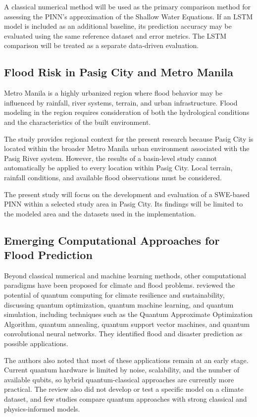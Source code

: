 A classical numerical method will be used as the primary comparison method for assessing the PINN's approximation of the Shallow Water Equations. If an LSTM model is included as an additional baseline, its prediction accuracy may be evaluated using the same reference dataset and error metrics. The LSTM comparison will be treated as a separate data-driven evaluation.

\subsection{Flood Risk in Pasig City and Metro Manila}

Metro Manila is a highly urbanized region where flood behavior may be influenced by rainfall, river systems, terrain, and urban infrastructure. Flood modeling in the region requires consideration of both the hydrological conditions and the characteristics of the built environment.

The study provides regional context for the present research because Pasig City is located within the broader Metro Manila urban environment associated with the Pasig River system. However, the results of a basin-level study cannot automatically be applied to every location within Pasig City. Local terrain, rainfall conditions, and available flood observations must be considered.

The present study will focus on the development and evaluation of a SWE-based PINN within a selected study area in Pasig City. Its findings will be limited to the modeled area and the datasets used in the implementation.

\subsection{Emerging Computational Approaches for Flood Prediction}

Beyond classical numerical and machine learning methods, other computational paradigms have been proposed for climate and flood problems.  reviewed the potential of quantum computing for climate resilience and sustainability, discussing quantum optimization, quantum machine learning, and quantum simulation, including techniques such as the Quantum Approximate Optimization Algorithm, quantum annealing, quantum support vector machines, and quantum convolutional neural networks. They identified flood and disaster prediction as possible applications.

The authors also noted that most of these applications remain at an early stage. Current quantum hardware is limited by noise, scalability, and the number of available qubits, so hybrid quantum-classical approaches are currently more practical. The review also did not develop or test a specific model on a climate dataset, and few studies compare quantum approaches with strong classical and physics-informed models.

